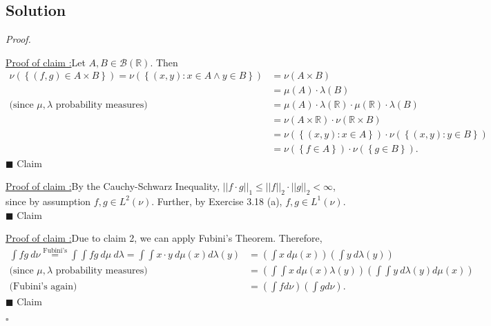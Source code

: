 \documentclass[12pt]{article}
\newcounter{ProofCounter}
\newcounter{ClaimCounter}[ProofCounter]
\newenvironment{Proof}{\stepcounter{ProofCounter}\textit{Proof.}}{\hfill$\square$}
\newenvironment{claim}[1]{\vspace{3mm}\stepcounter{ClaimCounter}\par\noindent\underline{\bf Claim \theClaimCounter:}\space#1}{}
\newenvironment{claimproof}[1]{\par\noindent\underline{Proof of claim \theClaimCounter:}\space#1}{\hfill $\blacksquare$ Claim \theClaimCounter}
\begin{document}
\subsection*{Solution}
\begin{Proof}

\begin{claimproof}
Let $A, B \in \mathcal{B}(\mathbb{R})$. Then 
\begin{align*}
\nu\left( \left\{ (f,g) \in A\times B \right\} \right) = \nu\left(\left\{ (x,y) : x \in A \wedge y \in B \right\}\right) 
& = \nu\left( A\times B \right) \\
& = \mu(A)\cdot\lambda(B) \\
\text{(since $\mu, \lambda$ probability measures) } & = \mu(A)\cdot\lambda(\mathbb{R})\cdot\mu(\mathbb{R})\cdot \lambda(B) \\
& = \nu\left( A\times \mathbb{R} \right)\cdot \nu\left( \mathbb{R} \times B \right) \\
& = \nu\left( \left\{ (x,y) : x \in A \right\} \right)\cdot \nu\left( \left\{ (x,y) : y\in B \right\} \right) \\
& = \nu\left( \left\{ f \in A \right\} \right)\cdot \nu\left( \left\{ g \in B \right\} \right).
\end{align*}
\end{claimproof}

\begin{claimproof}
By the Cauchy-Schwarz Inequality, $||f\cdot g||_{1} \leq ||f||_{2}\cdot ||g||_{2} < \infty$, since by assumption $f,g \in L^{2}(\nu)$. Further, by
Exercise 3.18 (a), $f, g \in L^{1}(\nu)$.
\end{claimproof}

\begin{claimproof}
Due to claim 2, we can apply Fubini's Theorem. Therefore,
\begin{align*}
\int fg\ d\nu \stackrel{\text{Fubini's}}{=} \int \int fg\ d\mu\  d\lambda = \int \int x\cdot y\ d\mu(x)d\lambda(y) & = \left( \int x\ d\mu(x) \right)\left( \int y\ d\lambda(y) \right) \\
\text{(since $\mu, \lambda$ probability measures) } & = \left(\int \int x\ d\mu(x)\lambda(y)\right)\left( \int \int y\ d\lambda(y)d\mu(x) \right) \\
\text{(Fubini's again) } & = \left( \int fd\nu \right)\left( \int gd\nu \right).
\end{align*}
\end{claimproof}

\end{Proof}
\end{document}

